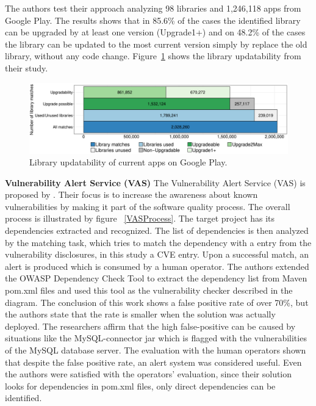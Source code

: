 \documentclass[pdf,bookmarks,colorlinks=true]{IEEEtran}
\begin{document}
The authors test their approach analyzing 98 libraries and 1,246,118 apps from Google Play. The results shows that in 85.6\% of the cases the identified library can be upgraded by at least one version (Upgrade1+) and on 48.2\% of the cases the library can be updated to the most current version simply by replace the old library, without any code change. Figure~\ref{LibraryUpdatability} shows the library updatability from their study.
 
\begin{figure}[h]
	\centering
	\includegraphics[scale=0.28]{LibraryUpdatability.png}
	\caption{Library updatability of current apps on Google Play.}
	\label{LibraryUpdatability}
\end{figure}



\textbf{Vulnerability Alert Service (VAS)}
The Vulnerability Alert Service (VAS) is proposed by \cite{Cadariu2015}. Their focus is to increase the awareness about known vulnerabilities by making it part of the software quality process. The overall process is illustrated by figure ~\ref{VASProcess}. The target project has its dependencies extracted and recognized. The list of dependencies is then analyzed by the matching task, which tries to match the dependency with a entry from the vulnerability disclosures, in this study a CVE entry. Upon a successful match, an alert is produced which is consumed by a human operator. The authors extended the OWASP Dependency Check Tool to extract the dependency list from Maven pom.xml files and used this tool as the vulnerability checker described in the diagram.
The conclusion of this work shows a false positive rate of over 70\%, but the authors state that the rate is smaller when the solution was actually deployed. 
The researchers affirm that the high false-positive can be caused by situations like the MySQL-connector jar which is flagged with the vulnerabilities of the MySQL database server. The evaluation with the human operators shown that despite the false positive rate, an alert system was considered useful. Even the authors were satisfied with the operators' evaluation, since their solution looks for dependencies in pom.xml files, only direct dependencies can be identified.
\end{document}
